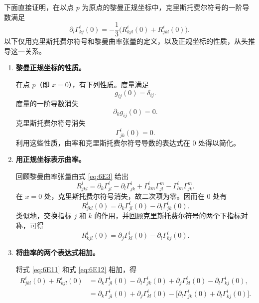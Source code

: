 下面直接证明，在以点 $p$ 为原点的黎曼正规坐标中，克里斯托费尔符号的一阶导数满足
\begin{equation*}
  \partial_l\Gamma^i_{kj}(0)=-\frac13\bigl(R^i_{kjl}(0)+R^i_{jkl}(0)\bigr).
  \tag{6E6}\label{eq:6E6}
\end{equation*}
以下仅用克里斯托费尔符号和黎曼曲率张量的定义，以及正规坐标的性质，从头推导这一关系。
\begin{enumerate}
\item \textbf{黎曼正规坐标的性质。}

在点 $p$（即 $x=0$），有下列性质。度量满足
\begin{equation*}
  g_{ij}(0)=\delta_{ij}.
  \tag{6E7}\label{eq:6E7}
\end{equation*}
度量的一阶导数消失
\begin{equation*}
  \partial_k g_{ij}(0)=0.
  \tag{6E8}\label{eq:6E8}
\end{equation*}
克里斯托费尔符号消失
\begin{equation*}
  \Gamma^i_{jk}(0)=0.
  \tag{6E9}\label{eq:6E9}
\end{equation*}
利用这些性质，曲率和克里斯托费尔符号导数的表达式在 0 处得以简化。
\item \textbf{用正规坐标表示曲率。}

回顾黎曼曲率张量由式 \eqref{eq:6E3} 给出
\begin{equation*}
  R^i_{jkl}=\partial_k\Gamma^i_{jl}-\partial_l\Gamma^i_{jk}
       +\Gamma^i_{km}\Gamma^m_{jl}-\Gamma^i_{lm}\Gamma^m_{jk}.
  \tag{6E10}\label{eq:6E10}
\end{equation*}
在 $x=0$ 处，克里斯托费尔符号消失，故二次项为零。因而在 0 处有
\begin{equation*}
  R^i_{jkl}(0)=\partial_k\Gamma^i_{jl}(0)-\partial_l\Gamma^i_{jk}(0).
  \tag{6E11}\label{eq:6E11}
\end{equation*}
类似地，交换指标 $j$ 和 $k$ 的作用，并回顾克里斯托费尔符号的两个下指标对称，可得
\begin{equation*}
  R^i_{kjl}(0)=\partial_j\Gamma^i_{kl}(0)-\partial_l\Gamma^i_{kj}(0).
  \tag{6E12}\label{eq:6E12}
\end{equation*}
\item \textbf{将曲率的两个表达式相加。}

将式 \eqref{eq:6E11} 和式 \eqref{eq:6E12} 相加，得
\begin{equation*}
\begin{aligned}
  R^i_{jkl}(0)+R^i_{kjl}(0)
   &=\partial_k\Gamma^i_{jl}(0)-\partial_l\Gamma^i_{jk}(0)
      +\partial_j\Gamma^i_{kl}(0)-\partial_l\Gamma^i_{kj}(0),\\
   &=\partial_k\Gamma^i_{jl}(0)+\partial_j\Gamma^i_{kl}(0)
      -\bigl[\partial_l\Gamma^i_{jk}(0)+\partial_l\Gamma^i_{kj}(0)\bigr].
\end{aligned}
\tag{6E13}\label{eq:6E13}
\end{equation*}


\end{enumerate}

